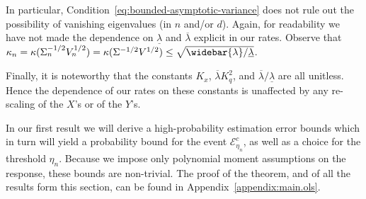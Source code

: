\documentclass[11pt]{article}
\begin{document}
In particular, Condition~\ref{eq:bounded-asymptotic-variance} does not rule out the possibility of vanishing eigenvalues (in $n$ and/or $d$). Again, for readability we have not made the dependence on $\underline{\lambda}$ and $\overline{\lambda}$ explicit in our rates. Observe that $\kappa_n = \kappa(\Sigma_n^{-1/2}V_n^{1/2}) = \kappa(\Sigma^{-1/2}V^{1/2}) \le \sqrt{\widebar{\lambda}/\underline{\lambda}}$.

Finally, it is noteworthy that the constants $K_x$, $\overline{\lambda} K_q^2$, and $\overline{\lambda}/\underline{\lambda}$ are all unitless. Hence the dependence of our rates on these constants is unaffected by any re-scaling of the $X$'s or of the $Y$'s. %

In our first result we will derive a high-probability estimation error bounds which in turn will yield a probability bound for the event $\mathcal{E}^c_{\eta_n}$, as well as a choice for the threshold $\eta_n$. Because we impose only polynomial moment assumptions on the response, these bounds are non-trivial. The proof of the theorem, and of all the results form this section, can be found  in Appendix~\ref{appendix:main.ols}.  
\end{document}
